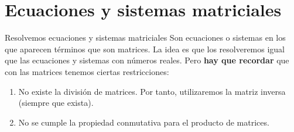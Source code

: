 \documentclass[11pt,a4paper]{article}
\newcommand{\fmuline}[1]{\textbf{\color{fmaccent}#1}}
\begin{document}
\section{Ecuaciones y sistemas matriciales}\hypertarget{sec7}{}

\begin{fmprop}{Resolvemos ecuaciones y sistemas matriciales}
Son ecuaciones o sistemas en los que aparecen términos que son matrices. La idea es que los resolveremos igual que las ecuaciones y sistemas con números reales. Pero \fmuline{hay que recordar} que con las matrices tenemos ciertas restricciones:

\begin{enumerate}
\item No existe la división de matrices. Por tanto, utilizaremos la matriz inversa (siempre que exista).
\item No se cumple la propiedad conmutativa para el producto de matrices.
\end{enumerate}
\end{fmprop}
\end{document}
